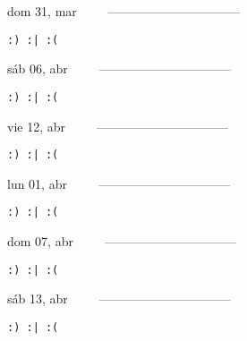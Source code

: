 \documentclass[letterpaper,10pt]{article}
\begin{document}
\begin{multicols}{3}
{dom 31, mar\ \ \ \ \ --------------------------------}
\begin{flushright}\begin{small}\texttt{:) :| :(}\end{small}\end{flushright}
\vfill
{sáb 06, abr\ \ \ \ \ --------------------------------}
\begin{flushright}\begin{small}\texttt{:) :| :(}\end{small}\end{flushright}\par
\vfill
{vie 12, abr\ \ \ \ \ --------------------------------}
\begin{flushright}\begin{small}\texttt{:) :| :(}\end{small}\end{flushright}\par
\vfill
\end{multicols}
\vspace{1.05cm}

\begin{multicols}{3}
{lun 01, abr\ \ \ \ \ --------------------------------}
\begin{flushright}\begin{small}\texttt{:) :| :(}\end{small}\end{flushright}
\vfill
{dom 07, abr\ \ \ \ \ --------------------------------}
\begin{flushright}\begin{small}\texttt{:) :| :(}\end{small}\end{flushright}\par
\vfill
{sáb 13, abr\ \ \ \ \ --------------------------------}
\begin{flushright}\begin{small}\texttt{:) :| :(}\end{small}\end{flushright}\par
\vfill
\end{multicols}
\vspace{1.05cm}
\end{document}
